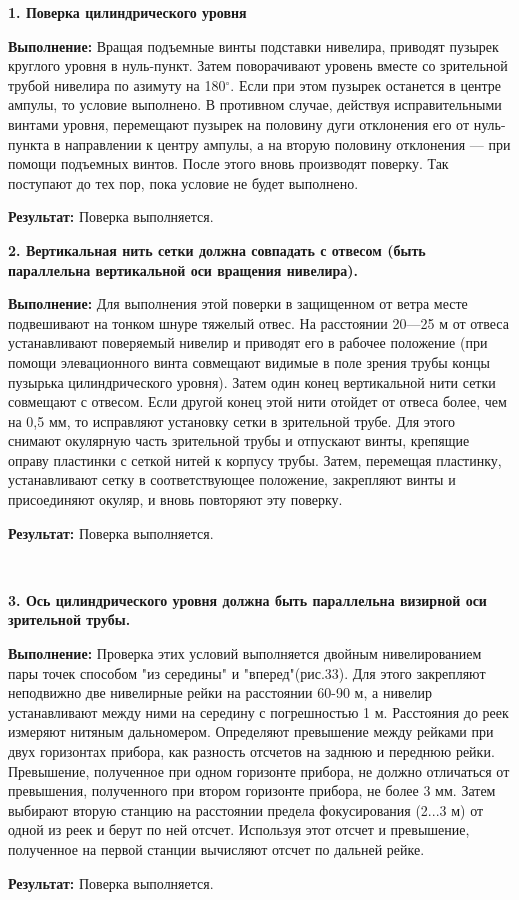 \documentclass[a4paper]{article}
\begin{document}
\begin{newpage}
\large{
    \par\textbf{1. Поверка цилиндрического уровня}
    \par\textbf{Выполнение:} Вращая подъемные винты подставки нивелира, приводят пузырек круглого уровня в нуль-пункт. Затем поворачивают уровень вместе со зрительной трубой нивелира по азимуту на 180$^\circ$. Если при этом пузырек останется в центре ампулы, то условие выполнено. В противном случае, действуя исправительными винтами уровня, перемещают пузырек на половину дуги отклонения его от нуль-пункта в направлении к центру ампулы, а на вторую половину отклонения — при помощи подъемных винтов. После этого вновь производят поверку. Так поступают до тех пор, пока условие не будет выполнено.
    \par\textbf{Результат:} Поверка выполняется.
}
\large{
    \par\textbf{2. Вертикальная нить сетки должна совпадать с отвесом (быть параллельна вертикальной оси вращения нивелира).}
    \par\textbf{Выполнение:} Для выполнения этой поверки в защищенном от ветра месте подвешивают на тонком шнуре тяжелый отвес. На расстоянии 20—25 м от отвеса устанавливают поверяемый нивелир и приводят его в рабочее положение (при помощи элевационного винта совмещают видимые в поле зрения трубы концы пузырька цилиндрического уровня). Затем один конец вертикальной нити сетки совмещают с отвесом. Если другой конец этой нити отойдет от отвеса более, чем на 0,5 мм, то исправляют установку сетки в зрительной трубе. Для этого снимают окулярную часть зрительной трубы и отпускают винты, крепящие оправу пластинки с сеткой нитей к корпусу трубы. Затем, перемещая пластинку, устанавливают сетку в соответствующее положение, закрепляют винты и присоединяют окуляр, и вновь повторяют эту поверку.
    \par\textbf{Результат:} Поверка выполняется.
}
\\
\large{
    \par\textbf{3. Ось цилиндрического уровня должна быть параллельна визирной оси зрительной трубы.}
    \par\textbf{Выполнение:} Проверка этих условий выполняется двойным нивелированием пары точек способом "из середины" и "вперед"(рис.33). Для этого закрепляют неподвижно две нивелирные рейки на расстоянии 60-90 м, а нивелир устанавливают между ними на середину с погрешностью 1 м. Расстояния до реек измеряют нитяным дальномером. Определяют превышение между рейками при двух горизонтах прибора, как разность отсчетов на заднюю и переднюю рейки. Превышение, полученное при одном горизонте прибора, не должно отличаться от превышения, полученного при втором горизонте прибора, не более 3 мм. Затем выбирают вторую станцию на расстоянии предела фокусирования (2...3 м) от одной из реек и берут по ней отсчет. Используя этот отсчет и превышение, полученное на первой станции вычисляют отсчет по дальней рейке.
    \par\textbf{Результат:} Поверка выполняется.
}

\end{newpage}
\end{document}

